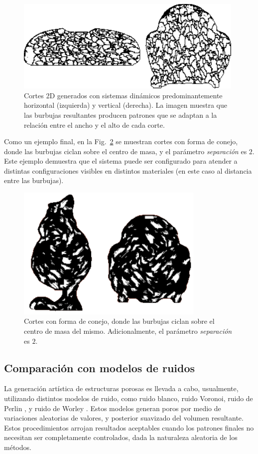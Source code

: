 \begin{figure}
  \centerline{\includegraphics[width=11cm]{figures/Fig6}}
  \caption{Cortes 2D generados con sistemas dinámicos predominantemente horizontal (izquierda) y vertical (derecha). La imagen muestra que las burbujas resultantes producen patrones que se adaptan a la relación entre el ancho y el alto de cada corte.}
  \label{fg:Fig6}
\end{figure}


Como un ejemplo final, en la Fig.~\ref{fg:Fig7} se muestran cortes con forma de conejo, donde las burbujas ciclan sobre el centro de masa, y el parámetro {\em separación} es $2$.
Este ejemplo demuestra que el sistema puede ser configurado para atender a distintas configuraciones visibles en distintos materiales (en este caso al distancia entre las burbujas).


\begin{figure}
  \centerline{\includegraphics[width=9cm]{figures/Fig7}}
  \caption{Cortes con forma de conejo, donde las burbujas ciclan sobre el centro de masa del mismo. Adicionalmente, el parámetro {\em separación} es $2$.}
  \label{fg:Fig7}
\end{figure}

\subsection{Comparación con modelos de ruidos}
La generación artística de estructuras porosas es llevada a cabo, usualmente, utilizando distintos modelos de ruido, como ruido blanco, ruido Voronoi, ruido de Perlin \cite{Perlin1985}, y ruido de Worley \cite{Worley1996}.
Estos modelos generan poros por medio de variaciones aleatorias de valores, y posterior suavizado del volumen resultante.
Estos procedimientos arrojan resultados aceptables cuando los patrones finales no necesitan ser completamente controlados, dada la naturaleza aleatoria de los métodos.

